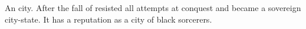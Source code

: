 \documentclass
  [a4paper,
   12pt,
   oneside
  ]%
  {article}
\begin{document}
\begin{gloss}
\begin{comment}
\paragraph{Yormis}
\end{comment}
\gitem{\Yormis}
An \Ortaican city. 
After the fall of \Ortaica \Yormis resisted all attempts at conquest and became a sovereign city-state. 
It has a reputation as a city of black sorcerers. 









\end{gloss}
\end{document}
